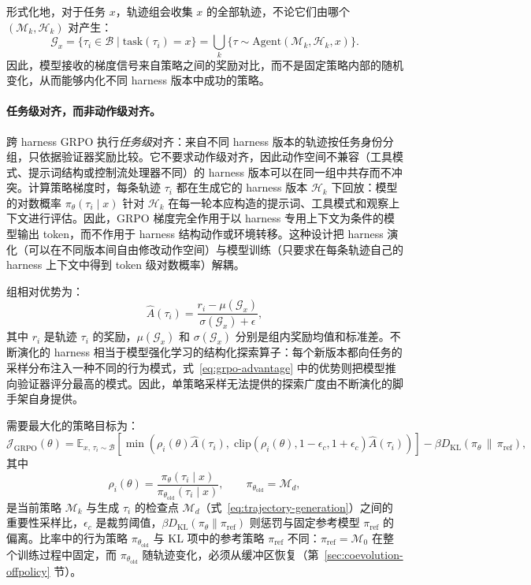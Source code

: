 形式化地，对于任务 $x$，轨迹组会收集 $x$ 的全部轨迹，不论它们由哪个 $(\mathcal{M}_k,\mathcal{H}_k)$ 对产生：
\begin{equation}
  \mathcal{G}_x=\{\tau_i\in\mathcal{B}\mid\text{task}(\tau_i)=x\}
  =\bigcup_k\{\tau\sim\text{Agent}(\mathcal{M}_k,\mathcal{H}_k,x)\}.
  \label{eq:cross-harness-group}
\end{equation}
因此，模型接收的梯度信号来自策略之间的奖励对比，而不是固定策略内部的随机变化，从而能够内化不同 harness 版本中成功的策略。

\paragraph{任务级对齐，而非动作级对齐。}
跨 harness GRPO 执行\textit{任务级}对齐：来自不同 harness 版本的轨迹按任务身份分组，只依据验证器奖励比较。它不要求动作级对齐，因此动作空间不兼容（工具模式、提示词结构或控制流处理器不同）的 harness 版本可以在同一组中共存而不冲突。计算策略梯度时，每条轨迹 $\tau_i$ 都在生成它的 harness 版本 $\mathcal{H}_k$ 下回放：模型的对数概率 $\pi_\theta(\tau_i\mid x)$ 针对 $\mathcal{H}_k$ 在每一轮本应构造的提示词、工具模式和观察上下文进行评估。因此，GRPO 梯度完全作用于以 harness 专用上下文为条件的模型输出 token，而不作用于 harness 结构动作或环境转移。这种设计把 harness 演化（可以在不同版本间自由修改动作空间）与模型训练（只要求在每条轨迹自己的 harness 上下文中得到 token 级对数概率）解耦。

组相对优势为：
\begin{equation}
  \hat{A}(\tau_i)=\frac{r_i-\mu(\mathcal{G}_x)}{\sigma(\mathcal{G}_x)+\epsilon},
  \label{eq:grpo-advantage}
\end{equation}
其中 $r_i$ 是轨迹 $\tau_i$ 的奖励，$\mu(\mathcal{G}_x)$ 和 $\sigma(\mathcal{G}_x)$ 分别是组内奖励均值和标准差。不断演化的 harness 相当于模型强化学习的结构化探索算子：每个新版本都向任务的采样分布注入一种不同的行为模式，式~\ref{eq:grpo-advantage} 中的优势则把模型推向验证器评分最高的模式。因此，单策略采样无法提供的探索广度由不断演化的脚手架自身提供。

需要最大化的策略目标为：
\begin{equation}
  \mathcal{J}_{\text{GRPO}}(\theta)=\mathbb{E}_{x,\,\tau_i\sim\mathcal{B}}\!\left[\min\!\left(\rho_i(\theta)\hat{A}(\tau_i),\;\text{clip}\!\left(\rho_i(\theta),1{-}\epsilon_c,1{+}\epsilon_c\right)\hat{A}(\tau_i)\right)\right]-\beta D_{\text{KL}}\!\left(\pi_\theta\,\|\,\pi_{\text{ref}}\right),
  \label{eq:grpo-objective}
\end{equation}
其中
\begin{equation}
  \rho_i(\theta)=\frac{\pi_\theta(\tau_i\mid x)}{\pi_{\theta_{\text{old}}}(\tau_i\mid x)},\qquad \pi_{\theta_{\text{old}}}=\mathcal{M}_d,
  \label{eq:grpo-ratio}
\end{equation}
是当前策略 $\mathcal{M}_k$ 与生成 $\tau_i$ 的检查点 $\mathcal{M}_d$（式~\ref{eq:trajectory-generation}）之间的重要性采样比，$\epsilon_c$ 是裁剪阈值，$\beta D_{\text{KL}}(\pi_\theta\|\pi_{\text{ref}})$ 则惩罚与固定参考模型 $\pi_{\text{ref}}$ 的偏离。比率中的行为策略 $\pi_{\theta_{\text{old}}}$ 与 KL 项中的参考策略 $\pi_{\text{ref}}$ 不同：$\pi_{\text{ref}}=\mathcal{M}_0$ 在整个训练过程中固定，而 $\pi_{\theta_{\text{old}}}$ 随轨迹变化，必须从缓冲区恢复（第~\ref{sec:coevolution-offpolicy} 节）。

